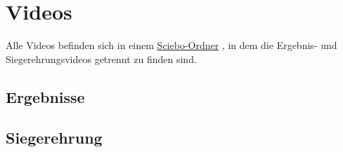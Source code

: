 \chapter{Videos}

Alle Videos befinden sich in einem
\href{https://uni-muenster.sciebo.de/s/FCpRRcPnGg2HgHa}{Sciebo-Ordner}
, in dem die Ergebnis- und Siegerehrungsvideos getrennt zu finden sind.
\section{Ergebnisse}
\section{Siegerehrung}
